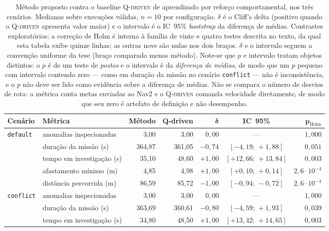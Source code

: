 \begin{table}[htb]
\centering
\caption{Método proposto contra o baseline \textsc{Q-driven} de aprendizado por
reforço comportamental, nos três cenários. Medianas sobre execuções válidas,
$n=10$ por configuração. $\delta$ é o Cliff's delta (positivo quando o
\textsc{Q-driven} apresenta valor maior) e o intervalo é o IC~$95\%$
\textit{bootstrap} da diferença de médias. Contrastes exploratórios; a correção de
Holm é interna à família de vinte e quatro testes descrita no texto, da qual esta
tabela exibe quinze linhas; as outras nove são nulas nos dois braços. $\delta$ e o intervalo seguem a convenção
uniforme da tese (braço comparado menos método). Note-se que $p$ e intervalo tratam
objetos distintos: o $p$ é de um teste de \emph{postos} e o intervalo é da
\emph{diferença de médias}, de modo que um $p$ pequeno com intervalo contendo zero ---
como em duração da missão no cenário \texttt{conflict} --- não é inconsistência, e o
$p$ não deve ser lido como evidência sobre a diferença de médias. Não se compara o
número de desvios de rota: a métrica conta metas enviadas ao Nav2 e o
\textsc{Q-driven} comanda velocidade diretamente, de modo que seu zero é artefato de
definição e não desempenho.}
\label{tab:res-qdriven}
\footnotesize
\begin{tabular}{llrrrcr}
\hline
\textbf{Cenário} & \textbf{Métrica} & \textbf{Método} & \textbf{Q-driven} &
$\bm{\delta}$ & \textbf{IC~95\%} & $\bm{p_{\mathrm{Holm}}}$\\
\hline
\texttt{default}  & anomalias inspecionadas   & 3,00 & 3,00 & $0{,}00$ & --- & $1{,}000$\\
                  & duração da missão (s)     & 364,87 & 361,05 & $-0{,}74$ & $[-4{,}19;\,+1{,}88]$ & $0{,}051$\\
                  & tempo em investigação (s) & 35,10 & 48,60 & $+1{,}00$ & $[+12{,}66;\,+13{,}84]$ & $0{,}003$\\
                  & afastamento mínimo (m)    & 4,85 & 4,98 & $+1{,}00$ & $[+0{,}10;\,+0{,}14]$ & $2{,}6\cdot10^{-4}$\\
                  & distância percorrida (m)  & 86,59 & 85,72 & $-1{,}00$ & $[-0{,}94;\,-0{,}72]$ & $2{,}6\cdot10^{-4}$\\
\hline
\texttt{conflict} & anomalias inspecionadas   & 3,00 & 3,00 & $0{,}00$ & --- & $1{,}000$\\
                  & duração da missão (s)     & 363,69 & 360,61 & $-0{,}80$ & $[-4{,}59;\,+1{,}93]$ & $0{,}039$\\
                  & tempo em investigação (s) & 34,80 & 48,50 & $+1{,}00$ & $[+13{,}42;\,+14{,}65]$ & $0{,}003$\\

\end{tabular}
\end{table}
